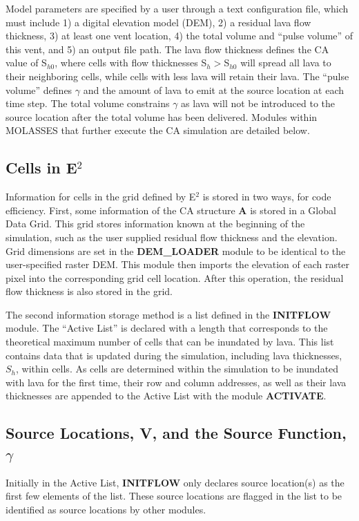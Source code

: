 \documentclass[12pt,letter]{article}
\begin{document}
		Model parameters are specified by a user through a text configuration file, which must include 1) a digital elevation model (DEM), 2) a residual lava flow thickness, 3) at least one vent location, 4) the total volume and ``pulse volume'' of this vent, and 5) an output file path. The lava flow thickness defines the CA value of S$_{h0}$, where cells with flow thicknesses S$_h>$S$_{h0}$ will spread all lava to their neighboring cells, while cells with less lava will retain their lava. The ``pulse volume'' defines $\gamma$ and the amount of lava to emit at the source location at each time step. The total volume constrains $\gamma$ as lava will not be introduced to the source location after the total volume has been delivered. Modules within MOLASSES that further execute the CA simulation are detailed below.
		
	\subsection[Cells in E2]{Cells in E$^2$}
		Information for cells in the grid defined by E$^2$ is stored in two ways, for code efficiency. First, some information of the CA structure \textbf{A} is stored in a Global Data Grid. This grid stores information known at the beginning of the simulation, such as the user supplied residual flow thickness and the elevation. Grid dimensions are set in the \textbf{DEM\_LOADER} module to be identical to the user-specified raster DEM. This module then imports the elevation of each raster pixel into the corresponding grid cell location. After this operation, the residual flow thickness is also stored in the grid.

		The second information storage method is a list defined in the \textbf{INITFLOW} module. The ``Active List'' is declared with a length that corresponds to the theoretical maximum number of cells that can be inundated by lava. This list contains data that is updated during the simulation, including lava thicknesses, $S_h$, within cells. As cells are determined within the simulation to be inundated with lava for the first time, their row and column addresses, as well as their lava thicknesses are appended to the Active List with the module \textbf{ACTIVATE}.
		
	\subsection[Source Locations and the Source Function]{Source Locations, V, and the Source Function, $\gamma$}
		Initially in the Active List, \textbf{INITFLOW} only declares source location(s) as the first few elements of the list. These source locations are flagged in the list to be identified as source locations by other modules.
\end{document}

